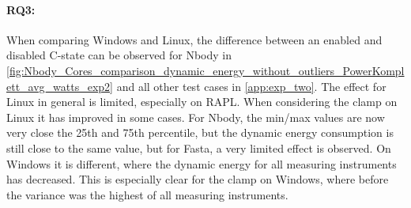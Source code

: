 \paragraph*{RQ3:} When comparing Windows and Linux, the difference between an enabled and disabled C-state can be observed for Nbody in \cref{fig:Nbody_Cores_comparison_dynamic_energy_without_outliers_PowerKomplett_avg_watts_exp2} and all other test cases in \cref{app:exp_two}. The effect for Linux in general is limited, especially on RAPL. When considering the clamp on Linux it has improved in some cases. For Nbody, the min/max values are now very close the 25th and 75th percentile, but the dynamic energy consumption is still close to the same value, but for Fasta, a very limited effect is observed. On Windows it is different, where the dynamic energy for all measuring instruments has decreased. This is especially clear for the clamp on Windows, where before the variance was the highest of all measuring instruments.




